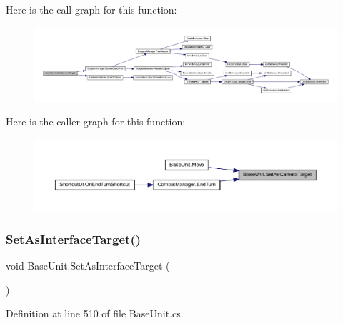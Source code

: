 Here is the call graph for this function\+:
\nopagebreak
\begin{figure}[H]
\begin{center}
\leavevmode
\includegraphics[width=350pt]{class_base_unit_ac4b2eaeb4641fc124d36d413b6193c56_cgraph}
\end{center}
\end{figure}
Here is the caller graph for this function\+:
\nopagebreak
\begin{figure}[H]
\begin{center}
\leavevmode
\includegraphics[width=350pt]{class_base_unit_ac4b2eaeb4641fc124d36d413b6193c56_icgraph}
\end{center}
\end{figure}
\mbox{\label{class_base_unit_abae0a52156648495ea6e8487782f8636}} 
\subsubsection{\texorpdfstring{SetAsInterfaceTarget()}{SetAsInterfaceTarget()}}
{\footnotesize\ttfamily void Base\+Unit.\+Set\+As\+Interface\+Target (\begin{DoxyParamCaption}{ }\end{DoxyParamCaption})}



Definition at line 510 of file Base\+Unit.\+cs.

